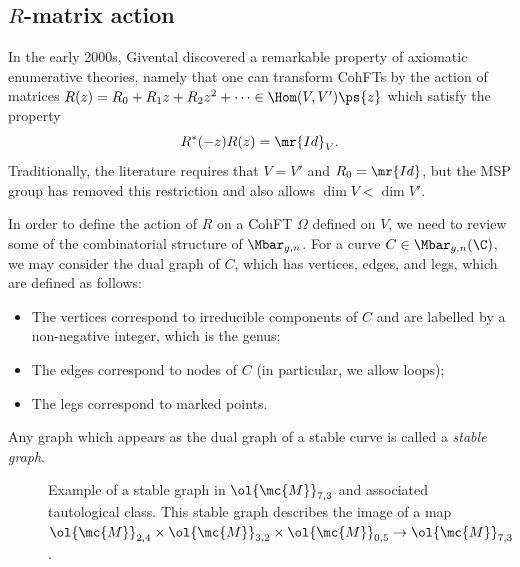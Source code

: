 \subsection{$R$-matrix action}%
\label{sub:R-matrix action}

In the early 2000s, Givental discovered a remarkable property of axiomatic enumerative theories, namely that one can transform CohFTs by the action of matrices $R(z) = R_0 + R_1 z + R_2 z^2 + \cdots \in \Hom(V, V')\ps{z}$ which satisfy the property
\[ R^*(-z) R(z) = \mr{Id}_V. \]
Traditionally, the literature requires that $V = V'$ and $R_0 = \mr{Id}$, but the MSP group has removed this restriction and also allows $\dim V < \dim V'$.

In order to define the action of $R$ on a CohFT $\Omega$ defined on $V$, we need to review some of the combinatorial structure of $\Mbar_{g,n}$. For a curve $C\in \Mbar_{g,n}(\C)$, we may consider the dual graph of $C$, which has vertices, edges, and legs, which are defined as follows:
\begin{itemize}
    \item The vertices correspond to irreducible components of $C$ and are labelled by a non-negative integer, which is the genus;
    \item The edges correspond to nodes of $C$ (in particular, we allow loops);
    \item The legs correspond to marked points.
\end{itemize}
Any graph which appears as the dual graph of a stable curve is called a \textit{stable graph}.

\begin{figure}[htpb]
  \centering
  \caption{Example of a stable graph in $\ol{\mc{M}}_{7,3}$ and associated tautological class. This stable graph describes the image of a map
    $\ol{\mc{M}}_{2,4} \times \ol{\mc{M}}_{3,2} \times \ol{\mc{M}}_{0,5} \to \ol{\mc{M}}_{7,3}$.}
  \label{fig:stablegraph}
\end{figure}

